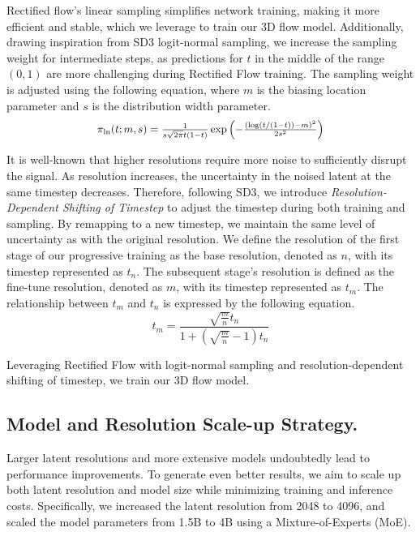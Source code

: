 Rectified flow's linear sampling simplifies network training, making it more efficient and stable, which we leverage to train our 3D flow model.
Additionally, drawing inspiration from SD3 logit-normal sampling, we increase the sampling weight for intermediate steps, as predictions for $t$ in the middle of the range $(0,1)$ are more challenging during Rectified Flow training. The sampling weight is adjusted using the following equation, where $m$ is the biasing location parameter and $s$ is the distribution width parameter.
\begin{equation}
\scalebox{0.95}{$
\pi_{\ln}(t; m, s) = \\
\frac{1}{s \sqrt{2\pi} t(1 - t)} \exp\left(-\frac{(\log(t/(1-t)) - m)^2}{2s^2}\right)
$}
\end{equation}

It is well-known that higher resolutions require more noise to sufficiently disrupt the signal. As resolution increases, the uncertainty in the noised latent at the same timestep decreases. Therefore, following SD3, we introduce \textit{Resolution-Dependent Shifting of Timestep} to adjust the timestep during both training and sampling. By remapping to a new timestep, we maintain the same level of uncertainty as with the original resolution.
We define the resolution of the first stage of our progressive training as the base resolution, denoted as 
$n$, with its timestep represented as $t_n$. The subsequent stage's resolution is defined as the fine-tune resolution, denoted as $m$, with its timestep represented as $t_m$. The relationship between $t_m$ and $t_n$ is expressed by the following equation.
\begin{equation}
t_m = \frac{\sqrt{\frac{m}{n}} t_n}{1 + \left(\sqrt{\frac{m}{n}} - 1\right) t_n}
\end{equation}

Leveraging Rectified Flow with logit-normal sampling and resolution-dependent shifting of timestep, we train our 3D flow model.




\subsection{Model and Resolution Scale-up Strategy.}\label{sec:scale_up}
Larger latent resolutions and more extensive models undoubtedly lead to performance improvements. To generate even better results, we aim to scale up both latent resolution and model size while minimizing training and inference costs. Specifically, we increased the latent resolution from 2048 to 4096, and scaled the model parameters from 1.5B to 4B using a Mixture-of-Experts (MoE).

